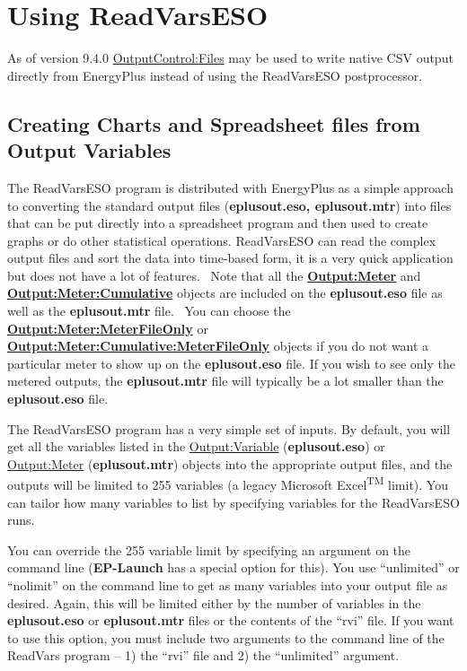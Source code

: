 \section{Using ReadVarsESO}\label{using-readvarseso}
As of version 9.4.0 \hyperref[outputcontrolfiles]{OutputControl:Files} may be used to write native CSV output directly from EnergyPlus instead of using the ReadVarsESO postprocessor.

\subsection{Creating Charts and Spreadsheet files from Output Variables}\label{creating-charts-and-spreadsheet-files-from-output-variables}

The ReadVarsESO program is distributed with EnergyPlus as a simple approach to converting the standard output files (\textbf{eplusout.eso, eplusout.mtr}) into files that can be put directly into a spreadsheet program and then used to create graphs or do other statistical operations. ReadVarsESO can read the complex output files and sort the data into time-based form, it is a very quick application but does not have a lot of features.~ Note that all the \textbf{\hyperref[outputmeter-and-outputmetermeterfileonly]{Output:Meter}} and \textbf{\hyperref[outputmetercumulative-and-outputmetercumulativemeterfileonly]{Output:Meter:Cumulative}} objects are included on the \textbf{eplusout.eso} file as well as the \textbf{eplusout.mtr} file.~ You can choose the \textbf{\hyperref[outputmeter-and-outputmetermeterfileonly]{Output:Meter:MeterFileOnly}} or \textbf{\hyperref[outputmetercumulative-and-outputmetercumulativemeterfileonly]{Output:Meter:Cumulative:MeterFileOnly}} objects if you do not want a particular meter to show up on the \textbf{eplusout.eso} file. If you wish to see only the metered outputs, the \textbf{eplusout.mtr} file will typically be a lot smaller than the \textbf{eplusout.eso} file.

The ReadVarsESO program has a very simple set of inputs. By default, you will get all the variables listed in the \hyperref[outputvariable]{Output:Variable} (\textbf{eplusout.eso}) or \hyperref[outputmeter-and-outputmetermeterfileonly]{Output:Meter} (\textbf{eplusout.mtr}) objects into the appropriate output files, and the outputs will be limited to 255 variables (a legacy Microsoft Excel\textsuperscript{TM} limit). You can tailor how many variables to list by specifying variables for the ReadVarsESO runs.

You can override the 255 variable limit by specifying an argument on the command line (\textbf{EP-Launch} has a special option for this). You use ``unlimited'' or ``nolimit'' on the command line to get as many variables into your output file as desired. Again, this will be limited either by the number of variables in the \textbf{eplusout.eso} or \textbf{eplusout.mtr} files or the contents of the ``rvi'' file. If you want to use this option, you must include two arguments to the command line of the ReadVars program -- 1) the ``rvi'' file and 2) the ``unlimited'' argument.

